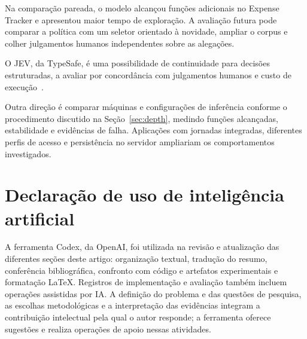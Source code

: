 \documentclass[12pt]{article}
\begin{document}
Na comparação pareada, o modelo alcançou funções adicionais no Expense Tracker e apresentou maior tempo de exploração. A avaliação futura pode comparar a política com um seletor orientado à novidade, ampliar o corpus e colher julgamentos humanos independentes sobre as alegações.

O JEV, da TypeSafe, é uma possibilidade de continuidade para decisões estruturadas, a avaliar por concordância com julgamentos humanos e custo de execução~\cite{typesafe2026jev}.

Outra direção é comparar máquinas e configurações de inferência conforme o procedimento discutido na Seção~\ref{sec:depth}, medindo funções alcançadas, estabilidade e evidências de falha. Aplicações com jornadas integradas, diferentes perfis de acesso e persistência no servidor ampliariam os comportamentos investigados.

\section*{Declaração de uso de inteligência artificial}
A ferramenta Codex, da OpenAI, foi utilizada na revisão e atualização das diferentes seções deste artigo: organização textual, tradução do resumo, conferência bibliográfica, confronto com código e artefatos experimentais e formatação LaTeX. Registros de implementação e avaliação também incluem operações assistidas por IA. A definição do problema e das questões de pesquisa, as escolhas metodológicas e a interpretação das evidências integram a contribuição intelectual pela qual o autor responde; a ferramenta oferece sugestões e realiza operações de apoio nessas atividades.



\end{document}
